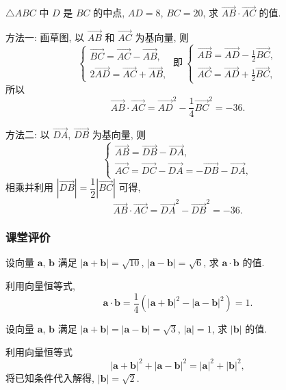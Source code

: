 \begin{exercise}
    $\triangle ABC$ 中 $D$ 是 $BC$ 的中点, $AD=8$, $BC=20$, 
    求 $\overrightarrow{AB}\cdot \overrightarrow{AC}$ 的值.
\end{exercise}
\beginsolution
    方法一: 画草图, 以 $\overrightarrow{AB}$ 和 $\overrightarrow{AC}$ 为基向量, 则
    \[\left\{\!\!\begin{array}{l}
        \overrightarrow{BC}= \overrightarrow{AC}-\overrightarrow{AB},\\
        2\overrightarrow{AD}= \overrightarrow{AC}+\overrightarrow{AB},
    \end{array}\right.\ \text{即}\ 
    \left\{\!\!\begin{array}{l}
        \overrightarrow{AB}= \overrightarrow{AD}- \frac12\overrightarrow{BC},\\[6pt]
        \overrightarrow{AC}= \overrightarrow{AD}+ \frac12\overrightarrow{BC},
    \end{array}\right.\]
    所以
    \[\overrightarrow{AB}\cdot \overrightarrow{AC}
        = \overrightarrow{AD}^2- \frac14\overrightarrow{BC}^2
        = -36.\]
    
    方法二: 以 $\overrightarrow{DA}$, $\overrightarrow{DB}$ 为基向量, 则
    \[\left\{\!\!\begin{array}{l}
        \overrightarrow{AB}= \overrightarrow{DB}- \overrightarrow{DA},\\
        \overrightarrow{AC}= \overrightarrow{DC}- \overrightarrow{DA}
            = -\overrightarrow{DB}- \overrightarrow{DA},
    \end{array}\right.\]
    相乘并利用 $|\overrightarrow{DB}|= \dfrac12|\overrightarrow{BC}|$ 可得, 
    \[\overrightarrow{AB}\cdot \overrightarrow{AC}
        = \overrightarrow{DA}^2- \overrightarrow{DB}^2
        = -36.\]
\endsolution

\subsubsection{课堂评价}

\begin{exercise}
    设向量 $\bm{a}$, $\bm{b}$ 满足 $|\bm{a}+\bm{b}|=\sqrt{10}$, 
    $|\bm{a}-\bm{b}|= \sqrt6$, 求 $\bm{a}\cdot\bm{b}$ 的值.
\end{exercise}
\beginsolution
    利用向量恒等式,
    \[\bm{a}\cdot\bm{b}
        = \frac14(|\bm{a}+\bm{b}|^2- |\bm{a}-\bm{b}|^2)
        = 1.\]
\endsolution

\begin{exercise}
    设向量 $\bm{a}$, $\bm{b}$ 满足 $|\bm{a}+\bm{b}|= |\bm{a}-\bm{b}|= \sqrt3$, $|\bm{a}|= 1$, 求 $|\bm{b}|$ 的值.
\end{exercise}
\beginsolution
    利用向量恒等式
    \[|\bm{a}+\bm{b}|^2+ |\bm{a}-\bm{b}|^2= |\bm{a}|^2+ |\bm{b}|^2,\]
    将已知条件代入解得, $|\bm{b}|=\sqrt2$.
\endsolution

